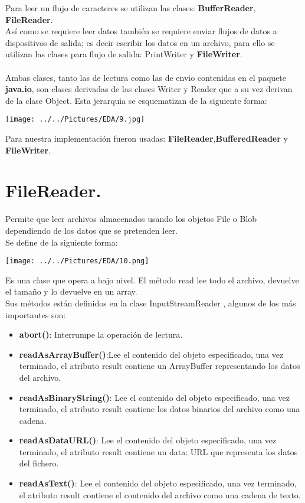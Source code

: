\documentclass[12pt,letterpaper]{report}
\begin{document}
Para leer un flujo de caracteres se utilizan las clases: \textbf{BufferReader}, \textbf{FileReader}.\\ Así como se requiere leer datos también se requiere enviar flujos de datos a dispositivos de salida; es decir escribir los datos en un archivo, para ello se utilizan las clases para flujo de salida: PrintWriter y \textbf{FileWriter}.\\\\ Ambas clases, tanto las de lectura como las de envio contenidas en el paquete \textbf{java.io}, son clases derivadas de las clases Writer y Reader que a su vez derivan de la clase Object. Esta jerarquia se esquematizan de la siguiente forma:\\
\begin{center}
\texttt{[image: ../../Pictures/EDA/9.jpg]} 
\end{center}
Para nuestra implementación fueron usadas: \textbf{FileReader},\textbf{BufferedReader} y \textbf{FileWriter}.\\
\section*{FileReader.}
Permite que leer archivos almacenados usando los objetos File o Blob dependiendo de los datos que se pretenden leer.\\ Se define de la siguiente forma:
\begin{center}
\texttt{[image: ../../Pictures/EDA/10.png]}  
\end{center}
Es una clase que opera a bajo nivel. El método read lee todo el archivo, devuelve el tamaño y lo devuelve en un array.\\
Sus métodos están definidos en la clase InputStreamReader , algunos de los más importantes son:
\begin{itemize}
	\item \textbf{abort()}: Interrumpe la operación de lectura. 
	\item \textbf{readAsArrayBuffer()}:Lee el contenido del objeto especificado, una vez terminado, el atributo result contiene un  ArrayBuffer representando los datos del archivo.
	\item \textbf{readAsBinaryString()}: Lee el contenido del objeto especificado, una vez terminado, el atributo result contiene los datos binarios del archivo como una cadena.
	\item \textbf{readAsDataURL()}: Lee el contenido del objeto especificado, una vez terminado, el atributo result contiene un data: URL que representa los datos del fichero.
	\item \textbf{readAsText()}: Lee el contenido del objeto especificado, una vez terminado, el atributo result contiene el contenido del archivo como una cadena de texto.\\\\
\end{itemize}
\end{document}
